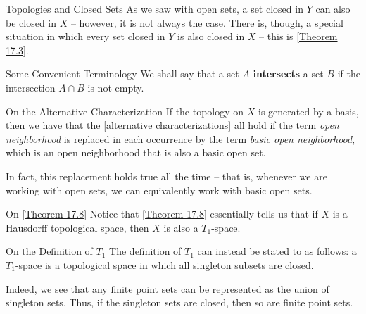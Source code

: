 \begin{remarkBox}{Topologies and Closed Sets}
    As we saw with open sets, a set closed in \( Y \) can also be closed in 
    \( X \) -- however, it is not always the case.
    There is, though, a special situation in which every set closed in \( Y \)
    is also closed in \( X \) -- this is [\hyperlink{thm:17.3}{Theorem 17.3}].
\end{remarkBox}

\begin{remarkBox}{Some Convenient Terminology}
    We shall say that a set \( A \) \textbf{intersects} a set \( B \) if the 
    intersection \( A \cap B \) is not empty.
\end{remarkBox}

\begin{remarkBox}{On the Alternative Characterization}
    If the topology on \( X \) is generated by a basis, then we have that the
    [\hyperlink{thm:17_alt_char}{alternative characterizations}] all hold if 
    the term \textit{open neighborhood} is replaced in each occurrence by the 
    term \textit{basic open neighborhood}, which is an open neighborhood that 
    is also a basic open set.

    \baseSkip 

    In fact, this replacement holds true all the time -- that is, whenever
    we are working with open sets, we can equivalently work with basic open
    sets.
\end{remarkBox}

\begin{remarkBox}{On [\hyperlink{thm:17.8}{Theorem 17.8}]}
    Notice that [\hyperlink{thm:17.8}{Theorem 17.8}] essentially tells us that 
    if \( X \) is a Hausdorff topological space, then \( X \) is also a 
    \( T_{ 1 } \)-space.
\end{remarkBox}

\begin{remarkBox}{On the Definition of \( T_{ 1 } \)}
    The definition of \( T_{ 1 } \) can instead be stated to as follows:
    a \( T_{ 1 } \)-space is a topological space in which all singleton
    subsets are closed.

    \baseSkip 

    Indeed, we see that any finite point sets can be represented as the union 
    of singleton sets. 
    Thus, if the singleton sets are closed, then so are finite point sets.
\end{remarkBox}